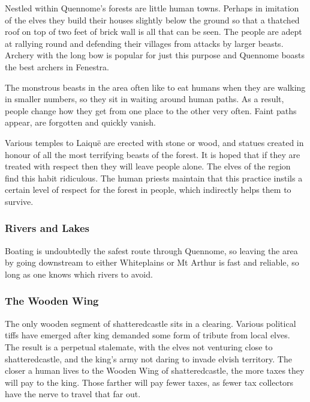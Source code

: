 \begin{multicols}{2}
Nestled within Quennome's forests are little human towns.
Perhaps in imitation of the elves they build their houses slightly below the ground so that a thatched roof on top of two feet of brick wall is all that can be seen.
The people are adept at rallying round and defending their villages from attacks by larger beasts.
Archery with the long bow is popular for just this purpose and Quennome boasts the best archers in Fenestra.

The monstrous beasts in the area often like to eat humans when they are walking in smaller numbers, so they sit in waiting around human paths.
As a result, people change how they get from one place to the other very often.
Faint paths appear, are forgotten and quickly vanish.

Various temples to Laiqu\"{e} are erected with stone or wood, and statues created in honour of all the most terrifying beasts of the forest.  It is hoped that if they are treated with respect then they will leave people alone.
The elves of the region find this habit ridiculous.
The human priests maintain that this practice instils a certain level of respect for the forest in people, which indirectly helps them to survive.

\subsubsection{Rivers and Lakes}

Boating is undoubtedly the safest route through Quennome, so leaving the area by going downstream to either Whiteplains or Mt Arthur is fast and reliable, so long as one knows which rivers to avoid.

\subsubsection{The Wooden Wing}

The only wooden segment of \gls{shatteredcastle} sits in a clearing.
Various political tiffs have emerged after \gls{king} demanded some form of tribute from local elves.
The result is a perpetual stalemate, with the elves not venturing close to \gls{shatteredcastle}, and the king's army not daring to invade elvish territory.
The closer a human lives to the Wooden Wing of \gls{shatteredcastle}, the more taxes they will pay to the king.
Those farther will pay fewer taxes, as fewer tax collectors have the nerve to travel that far out.

\iftoggle{players}{}{
\subsubsection{Seasonal Encounters}

}
\end{multicols}
